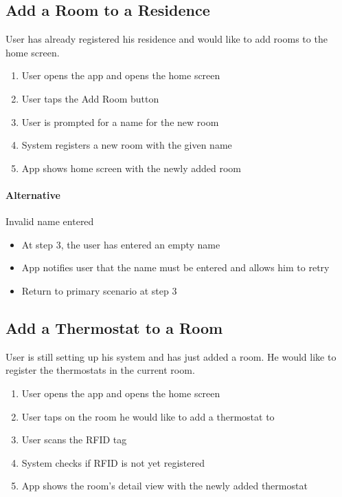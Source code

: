 \subsection*{Add a Room to a Residence}
User has already registered his residence and would like to add rooms to the home screen.
\begin{enumerate}
    \item User opens the app and opens the home screen
    \item User taps the Add Room button
    \item User is prompted for a name for the new room
    \item System registers a new room with the given name 
    \item App shows home screen with the newly added room
\end{enumerate}

\paragraph{Alternative} Invalid name entered
\begin{itemize}
    \item At step 3, the user has entered an empty name
    \item App notifies user that the name must be entered and allows him to retry
    \item Return to primary scenario at step 3
\end{itemize}

\subsection*{Add a Thermostat to a Room}
User is still setting up his system and has just added a room. He would like to register the thermostats in the current room.
\begin{enumerate}
    \item User opens the app and opens the home screen
    \item User taps on the room he would like to add a thermostat to
    \item User scans the RFID tag
    \item System checks if RFID is not yet registered
    \item App shows the room's detail view with the newly added thermostat
\end{enumerate}

